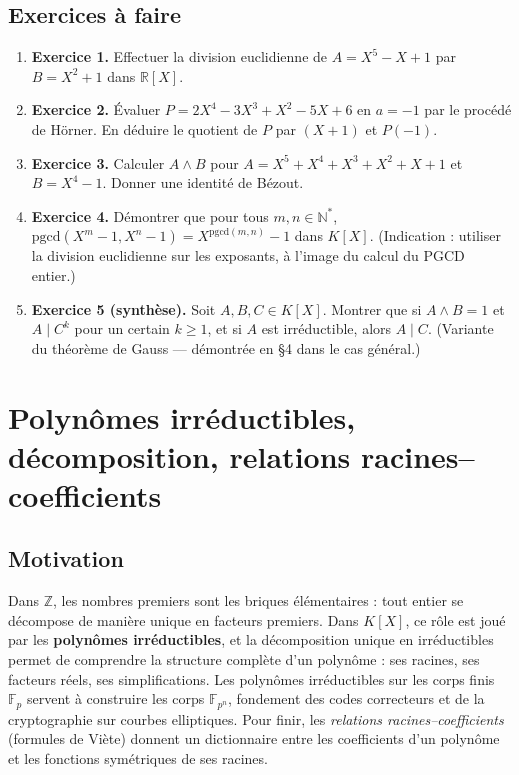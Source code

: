 \documentclass[12pt,a4paper]{report}
\theoremstyle{definition}
\theoremstyle{remark}
\begin{document}
\subsection{Exercices à faire}
\begin{enumerate}
    \item \textbf{Exercice 1.} Effectuer la division euclidienne de $A = X^5 - X + 1$ par $B = X^2 + 1$ dans $\mathbb{R}[X]$.
    \item \textbf{Exercice 2.} Évaluer $P = 2X^4 - 3X^3 + X^2 - 5X + 6$ en $a = -1$ par le procédé de Hörner. En déduire le quotient de $P$ par $(X + 1)$ et $P(-1)$.
    \item \textbf{Exercice 3.} Calculer $A \wedge B$ pour $A = X^5 + X^4 + X^3 + X^2 + X + 1$ et $B = X^4 - 1$. Donner une identité de Bézout.
    \item \textbf{Exercice 4.} Démontrer que pour tous $m, n \in \mathbb{N}^*$, $\mathrm{pgcd}(X^m - 1, X^n - 1) = X^{\mathrm{pgcd}(m, n)} - 1$ dans $K[X]$. (Indication : utiliser la division euclidienne sur les exposants, à l'image du calcul du PGCD entier.)
    \item \textbf{Exercice 5 (synthèse).} Soit $A, B, C \in K[X]$. Montrer que si $A \wedge B = 1$ et $A \mid C^k$ pour un certain $k \ge 1$, et si $A$ est irréductible, alors $A \mid C$. (Variante du théorème de Gauss --- démontrée en §4 dans le cas général.)
\end{enumerate}

\section{Polynômes irréductibles, décomposition, relations racines--coefficients}

\subsection{Motivation}
Dans $\mathbb{Z}$, les nombres premiers sont les briques élémentaires : tout entier se décompose de manière unique en facteurs premiers. Dans $K[X]$, ce rôle est joué par les \textbf{polynômes irréductibles}, et la décomposition unique en irréductibles permet de comprendre la structure complète d'un polynôme : ses racines, ses facteurs réels, ses simplifications. Les polynômes irréductibles sur les corps finis $\mathbb{F}_p$ servent à construire les corps $\mathbb{F}_{p^n}$, fondement des codes correcteurs et de la cryptographie sur courbes elliptiques. Pour finir, les \emph{relations racines--coefficients} (formules de Viète) donnent un dictionnaire entre les coefficients d'un polynôme et les fonctions symétriques de ses racines.
\end{document}
